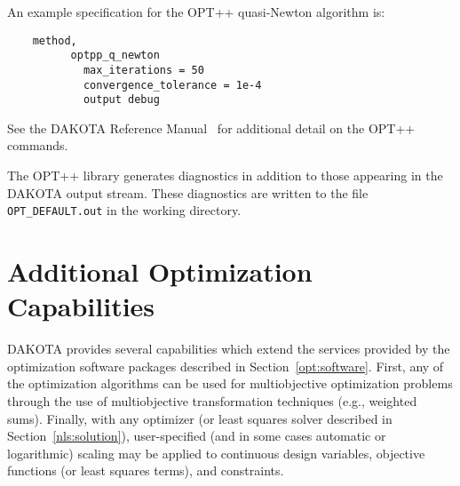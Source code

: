 An example specification for the OPT++ quasi-Newton algorithm is:
\begin{small}
\begin{verbatim}
    method,
          optpp_q_newton
            max_iterations = 50
            convergence_tolerance = 1e-4
            output debug
\end{verbatim}
\end{small}

See the DAKOTA Reference Manual~\cite{RefMan} for additional detail on the
OPT++ commands.

The OPT++ library generates diagnostics in addition to those appearing
in the DAKOTA output stream. These diagnostics are written to the file
\texttt{OPT\_DEFAULT.out} in the working directory.




\section{Additional Optimization Capabilities}\label{opt:additional}

DAKOTA provides several capabilities which extend the services
provided by the optimization software packages described in
Section~\ref{opt:software}. First, any of the optimization algorithms
can be used for multiobjective optimization problems through the use
of multiobjective transformation techniques (e.g., weighted sums). 
Finally, with any optimizer (or least squares solver described in
Section~\ref{nls:solution}), user-specified (and in some cases
automatic or logarithmic) scaling may be applied to continuous design
variables, objective functions (or least squares terms), and constraints.

